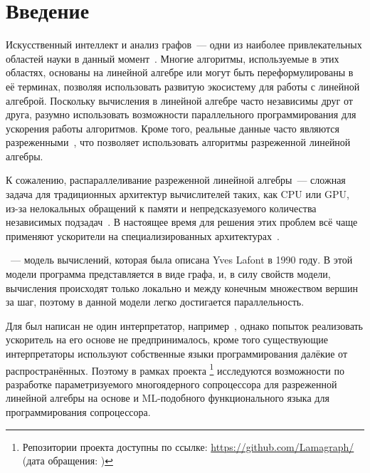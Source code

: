 

\section*{Введение}
\thispagestyle{withCompileDate}

Искусственный интеллект и анализ графов~--- одни из наиболее привлекательных областей науки в данный момент~\cite{chuiEconomicPotentialGenerative, garciaPathQueryingGraph2024}.
Многие алгоритмы, используемые в этих областях, основаны на линейной алгебре или могут быть переформулированы в её терминах, позволяя использовать развитую экосистему для работы с линейной алгеброй.
Поскольку вычисления в линейной алгебре часто независимы друг от друга, разумно использовать возможности параллельного программирования для ускорения работы алгоритмов.
Кроме того, реальные данные часто являются разреженными~\cite{davisUniversityFloridaSparse2011}, что позволяет использовать алгоритмы разреженной линейной алгебры.

К сожалению, распараллеливание разреженной линейной алгебры~--- сложная задача для традиционных архитектур вычислителей таких, как CPU или GPU, из-за нелокальных обращений к памяти и непредсказуемого количества независимых подзадач~\cite{duHighPerformanceSparseLinear2022,isaac-chassandeDedicatedHardwareAccelerators2024,mohammedPerformanceEnhancementStrategies2022}.
В настоящее время для решения этих проблем всё чаще применяют ускорители на специализированных архитектурах~\cite{dakkakAcceleratingReductionScan2019, zhuMobileMachineLearning2018, jouppiInDatacenterPerformanceAnalysis2017, akkadEmbeddedDeepLearning2024, silvanoSurveyDeepLearning2024}.

\INs{}~--- модель вычислений, которая была описана Yves Lafont в 1990 году.
В этой модели программа представляется в виде графа, и, в силу свойств модели, вычисления происходят только локально и между конечным множеством вершин за шаг, поэтому в данной модели легко достигается параллельность.

Для \INs{} был написан не один интерпретатор, например~\cite{mackieParallelEvaluationInteraction2016, salikhmetovTokenpassingOptimalReduction2016}, однако попыток реализовать ускоритель на его основе не предпринималось, кроме того существующие интерпретаторы используют собственные языки программирования далёкие от распространённых.
Поэтому в рамках проекта \Lamagraph{}\footnote{Репозитории проекта доступны по ссылке: \url{https://github.com/Lamagraph/} (дата обращения: )} исследуются возможности по разработке параметризуемого многоядерного сопроцессора для разреженной линейной алгебры на основе \INs{} и ML-подобного функционального языка для программирования сопроцессора.
